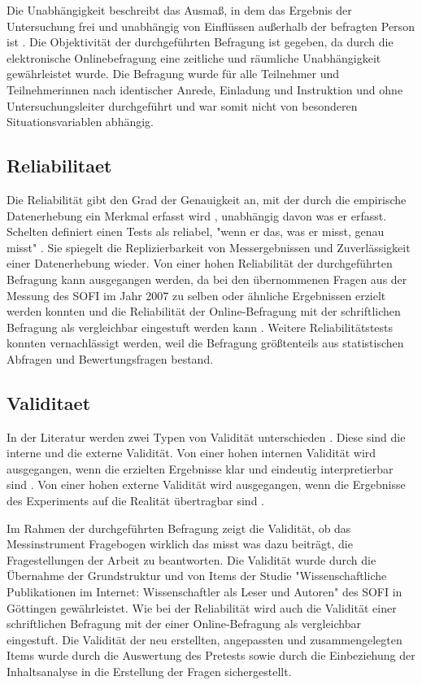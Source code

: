 Die Unabhängigkeit beschreibt das Ausmaß, in dem das Ergebnis der Untersuchung frei und unabhängig von Einflüssen außerhalb der befragten Person ist \cite{rost_2004_lehrbuch}. Die Objektivität der durchgeführten Befragung ist gegeben, da durch die elektronische Onlinebefragung eine zeitliche und räumliche Unabhängigkeit gewährleistet wurde. Die Befragung wurde für alle Teilnehmer und Teilnehmerinnen nach identischer Anrede, Einladung und Instruktion und ohne Untersuchungsleiter durchgeführt und war somit nicht von besonderen Situationsvariablen abhängig.

\subsection[Reliabilität]{Reliabilitaet}

Die Reliabilität gibt den Grad der Genauigkeit an, mit der durch die empirische Datenerhebung ein Merkmal erfasst wird \cite{rost_2004_lehrbuch}, unabhängig davon was er erfasst. Schelten definiert einen Tests als reliabel, "wenn er das, was er misst, genau misst" \cite{schelten_1997_testbeurteilung}.  Sie spiegelt die Replizierbarkeit von Messergebnissen und Zuverlässigkeit einer Datenerhebung wieder. Von einer hohen Reliabilität der durchgeführten Befragung kann ausgegangen werden, da bei den übernommenen Fragen aus der Messung des SOFI im Jahr 2007 zu selben oder ähnliche Ergebnissen erzielt werden konnten und die Reliabilität der Online-Befragung mit der schriftlichen Befragung als vergleichbar eingestuft werden kann \cite{suchen_DOI_10.1007/978-3-663-10948-8_10}. Weitere Reliabilitätstests konnten vernachlässigt werden, weil die Befragung größtenteils aus statistischen Abfragen und Bewertungsfragen bestand.

\subsection[Validität]{Validitaet}
In der Literatur werden zwei Typen von Validität unterschieden \cite{rost_2004_lehrbuch}. Diese sind die interne und die externe Validität. Von einer hohen internen Validität wird ausgegangen, wenn die erzielten Ergebnisse klar und eindeutig interpretierbar sind \cite{raab_2012_fragebogen}. Von einer hohen externe Validität wird ausgegangen, wenn die Ergebnisse des Experiments auf die Realität übertragbar sind \cite{bortz1995forschungsmethoden}.

Im Rahmen der durchgeführten Befragung zeigt die Validität, ob das Messinstrument Fragebogen wirklich das misst was dazu beiträgt, die Fragestellungen der Arbeit zu beantworten. Die Validität wurde durch die Übernahme der Grundstruktur und von Items der Studie "Wissenschaftliche Publikationen im Internet: Wissenschaftler als Leser und Autoren" des SOFI in Göttingen gewährleistet. Wie bei der Reliabilität wird auch die Validität einer schriftlichen Befragung mit der einer Online-Befragung als vergleichbar eingestuft. Die Validität der neu erstellten, angepassten  und zusammengelegten Items wurde durch die Auswertung des Pretests sowie durch die Einbeziehung der Inhaltsanalyse in die Erstellung der Fragen sichergestellt.

